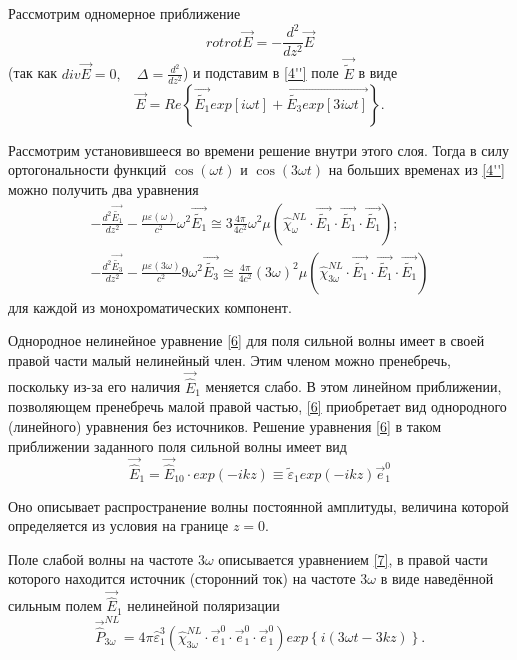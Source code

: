 \documentclass[a4paper]{article}
\begin{document}
\begin{itemize}
	Рассмотрим одномерное приближение 
	\begin{equation*}
		rotrot\vec{E}=-\frac{d^{2}}{dz^{2}}\vec{E}\tag{4''}\label{4''}
	\end{equation*}
	(так как $div\vec{E}=0,\quad\Delta=\frac{d^{2}}{dz^{2}}$) и подставим в \eqref{4''} поле $\vec{\tilde{E}}$ в виде 
	$$\vec{E}=Re\left\{\vec{\tilde{E_{1}}}exp\left[i\omega t\right]+\vec{\tilde{E_{3}}exp\left[3i\omega t\right]}\right\} .$$
	
	Рассмотрим установившееся во времени решение внутри этого слоя. Тогда в силу ортогональности функций $\cos(\omega t)$ и $\cos(3\omega t)$ на больших временах из \eqref{4''} можно получить два уравнения  
	\begin{align}
		-\frac{d^{2}\vec{\tilde{E_{1}}}}{dz^{2}}-\frac{\mu\varepsilon(\omega)}{c^{2}}\omega^{2}\vec{\tilde{E_{1}}}\cong3\frac{4\pi}{4c^{2}}\omega^{2}\mu\left(\hat{\chi}^{NL}_{\omega}\cdot\vec{\tilde{E_{1}}}\cdot\vec{\tilde{E_{1}}}\cdot\vec{\tilde{E_{1}}}\right);\label{6}\\		-\frac{d^{2}\vec{\tilde{E_{3}}}}{dz^{2}}-\frac{\mu\varepsilon(3\omega)}{c^{2}}9\omega^{2}\vec{\tilde{E_{3}}}\cong\frac{4\pi}{4c^{2}}\left(3\omega\right)^{2}\mu\left(\hat{\chi}^{NL}_{3\omega}\cdot\vec{\tilde{E_{1}}}\cdot\vec{\tilde{E_{1}}}\cdot\vec{\tilde{E_{1}}}\right)\label{7}
	\end{align}
для каждой из монохроматических компонент.

Однородное нелинейное уравнение \eqref{6} для поля сильной волны имеет в своей правой части малый нелинейный член. Этим членом можно пренебречь, поскольку из-за его наличия $\vec{\hat{E}}_{1}$ меняется слабо. В этом линейном приближении, позволяющем пренебречь малой правой частью, \eqref{6} приобретает вид однородного (линейного) уравнения без источников. Решение уравнения \eqref{6} в таком приближении заданного поля сильной волны имеет вид 
\begin{equation}
	\vec{\hat{E}}_{1}=\vec{\hat{E}}_{10}\cdot exp\left(-ikz\right)\equiv\tilde{\varepsilon}_{1}exp\left(-ikz\right)\vec{e}_{1}^{0}
\end{equation}

Оно описывает распространение волны постоянной амплитуды, величина которой определяется из условия на границе $z=0$.

Поле слабой волны на частоте $3\omega$ описывается уравнением \eqref{7}, в правой части которого находится источник (сторонний ток) на частоте $3\omega$ в виде наведённой сильным полем $\vec{\hat{E}}_{1}$ нелинейной поляризации 
\begin{equation}\label{v.9}
	\vec{\hat{P}}_{3\omega}^{NL}=4\pi\hat{\varepsilon}^{3}_{1}\left(\hat{\chi}_{3\omega}^{NL}\cdot\vec{e}^{0}_{1}\cdot\vec{e}^{0}_{1}\cdot\vec{e}^{0}_{1}\right)exp\left\{i\left(3\omega t-3kz\right)\right\}.
\end{equation}


\end{itemize}
\end{document}
